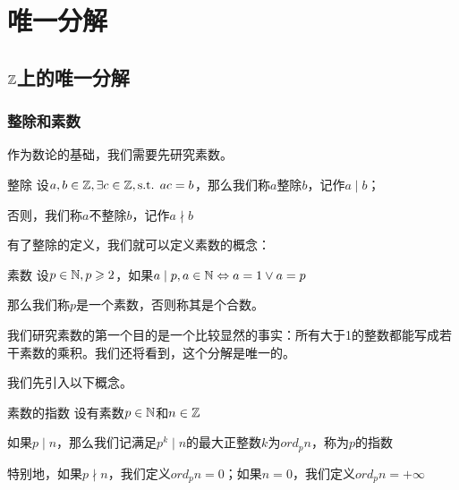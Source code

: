 \documentclass[12pt, a4paper, oneside, UTF8]{ctexbook}
\begin{document}
% 
\else
\fi
\chapter{唯一分解}
	\section{$\mathbb{Z}$上的唯一分解}
		\subsection{整除和素数}
			作为数论的基础，我们需要先研究素数。
			\begin{defn}{整除}{}
				设$a,b \in \mathbb{Z},\exists c \in \mathbb{Z},\text{s.t. }ac=b$，那么我们称$a$整除$b$，记作$a \mid b$；
				
				否则，我们称$a$不整除$b$，记作$a \nmid b$
			\end{defn}
			有了整除的定义，我们就可以定义素数的概念：
			\begin{defn}{素数}{}
				设$p \in \mathbb{N},p \geqslant 2$，如果$a \mid p,a \in \mathbb{N} \Leftrightarrow a = 1 \vee a = p$
				
				那么我们称$p$是一个素数，否则称其是个合数。
			\end{defn}
			我们研究素数的第一个目的是一个比较显然的事实：所有大于1的整数都能写成若干素数的乘积。我们还将看到，这个分解是唯一的。
			
			我们先引入以下概念。
			\begin{defn}{素数的指数}{}
				设有素数$p \in \mathbb{N}$和$n \in \mathbb{Z}$
				
				如果$p \mid n$，那么我们记满足$p^k \mid n$的最大正整数$k$为$ord_p n$，称为$p$的指数
				
				特别地，如果$p \nmid n$，我们定义$ord_p n = 0$；如果$n =0$，我们定义$ord_p n = +\infty$
			\end{defn}
\end{document}

